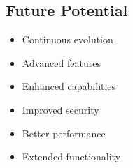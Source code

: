 \documentclass[12pt]{article}
\begin{document}
\subsection{Future Potential}
\begin{itemize}
\item Continuous evolution
\item Advanced features
\item Enhanced capabilities
\item Improved security
\item Better performance
\item Extended functionality
\end{itemize}
\end{document}

